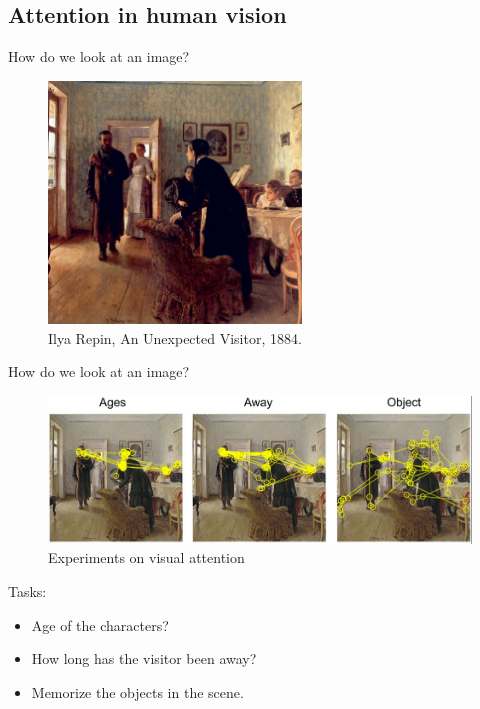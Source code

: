 \documentclass[xcolor=pdftex,dvipsnames,table,mathserif]{beamer}
\begin{document}
\subsection{Attention in human vision}


\begin{frame}{How do we look at an  image?}

\begin{figure}[ht]
  \centering
  \includegraphics[width=0.6\textwidth]{repin_unexpected_visitor}
  \caption{Ilya Repin, An Unexpected Visitor, 1884.}
\end{figure}

\end{frame}


\begin{frame}{How do we look at an image?}

\begin{figure}[ht]
  \centering
  \includegraphics[width=\textwidth]{Yarbus}
    \caption{Experiments on visual attention \cite{yarbus_eye_1967}}
\end{figure}

Tasks:
\begin{itemize}
\item Age of the characters?
\item How long has the visitor been away?
\item Memorize the objects in the scene.
\end{itemize}

\end{frame}
\end{document}
